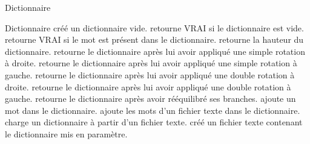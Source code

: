 \begin{tad}
	\tadParametres{}
	\begin{tadOperations}{Dictionnaire}
			{}%
			{}
			{}%
			{\tadUnParam{\booleen}}
			{}%
			{\tadUnParam{\booleen}}
			{}%
			{\tadUnParam{\entier}}	
			{}%
			{}	
			{}%
			{}	
			{}%
			{}
			{}%
			{}
			{}%
			{}		
			{}%
			{}
			{}%
			{}
			{\tadUnParam{\chaine}}%
			{}
			{}%
			{\tadUnParam{}}
		
	\end{tadOperations}
	
	\begin{tadSemantiques}{Dictionnaire}
			{cr\'e\'e un dictionnaire vide.}
			{retourne VRAI si le dictionnaire est vide.}
			{retourne VRAI si le mot est pr\'esent dans le dictionnaire.}
			{retourne la hauteur du dictionnaire.}
			{retourne le dictionnaire après lui avoir appliqué une simple rotation à droite.}
			{retourne le dictionnaire après lui avoir appliqué une simple rotation à gauche.}
			{retourne le dictionnaire après lui avoir appliqué une double rotation à droite.}
			{retourne le dictionnaire après lui avoir appliqué une double rotation à gauche.}
			{retourne le dictionnaire après avoir rééquilibré ses branches.}
			{ajoute un mot dans le dictionnaire.}
			{ajoute les mots d’un fichier texte dans le dictionnaire.}
			{charge un dictionnaire \`a partir d’un fichier texte.}
			{cr\'e\'e un fichier texte contenant le dictionnaire mis en paramètre.}
	\end{tadSemantiques}
	

\end{tad}
